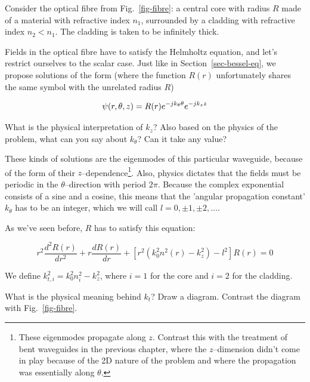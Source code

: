 Consider the optical fibre from Fig.~\ref{fig-fibre}: a central core with radius $R$ made of a material with refractive index $n_1$, surrounded by a cladding with refractive index $n_2 < n_1$. The cladding is taken to be infinitely thick. 

Fields in the optical fibre have to satisfy the Helmholtz equation, and let's restrict ourselves to the scalar case. Just like in Section~\ref{sec-bessel-eq}, we propose solutions of the form (where the function $R(r)$ unfortunately shares the same symbol with the unrelated radius $R$)

\begin{equation}
\psi(r,\theta,z) = R(r)e^{-j k_\theta \theta }e^{-j k_z z} \\
\end{equation}

\begin{cue}
What is the physical interpretation of $k_z$? Also based on the physics of the problem, what can you say about $k_\theta $? Can it take any value?  
\end{cue}

These kinds of solutions are the eigenmodes of this particular waveguide, because of the form of their $z$--dependence\footnote{These eigenmodes propagate along $z$. Contrast this with the treatment of bent waveguides in the previous chapter, where the $z$--dimension didn't come in play because of the 2D nature of the problem and where the propagation was essentially along $\theta$.}.  Also, physics dictates that the fields must be periodic in the $\theta$--direction with period $2 \pi$. Because the complex exponential consists of a sine and a cosine, this means that the 'angular propagation constant' $k_\theta$ has to be an integer, which we will call $l = 0, \pm 1, \pm 2, \ldots$.

As we've seen before, $R$ has to satisfy this equation:

\begin{equation}
r^2\frac{d^2 R(r)}{d r^2} + r \frac{d R(r)}{d r} + \left[{r^2 \left(k_0^2 n^2(r) - k_z^2\right) - l^2}\right]R(r) = 0 \label{eq-fibre-0}
\end{equation} 

We define $k_{t,i}^2=k_0^2 n_i^2 - k_z^2$, where $i=1$ for the core and $i=2$ for the cladding.

\begin{exer}
What is the physical meaning behind $k_t$? Draw a diagram. Contrast the diagram with Fig.~\ref{fig-fibre}.
\end{exer}

